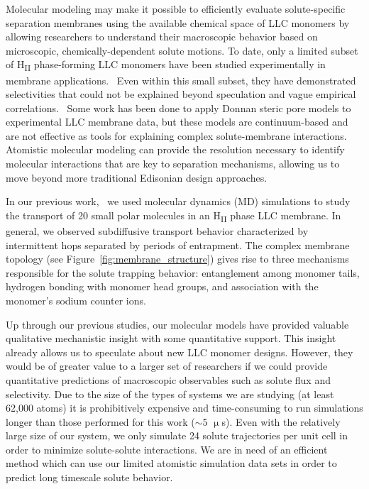 \documentclass[journal=jctcce,manuscript=article]{achemso}
\begin{document}
  Molecular modeling may make it possible to efficiently evaluate solute-specific
  separation membranes using the available chemical space of LLC monomers by 
  allowing researchers to understand their macroscopic behavior based on 
  microscopic, chemically-dependent solute motions. To date, only a limited 
  subset of H\textsubscript{II} phase-forming LLC monomers have been studied
  experimentally in membrane applications.~\cite{carter_glycerol-based_2012,hatakeyama_nanoporous_2010,smith_ordered_1997,zhou_assembly_2003,resel_structural_2000}
  Even within this small subset, they have demonstrated selectivities that
  could not be explained beyond speculation and vague empirical
  correlations.~\cite{dischinger_application_2017} 
  Some work has been done to apply
  Donnan steric pore models to experimental LLC membrane data, but these models 
  are continuum-based and are not effective as tools for explaining complex
  solute-membrane interactions.~\cite{hatakeyama_water_2011} 
  Atomistic molecular modeling can provide the 
  resolution necessary to identify molecular interactions that are key to separation
  mechanisms, allowing us to move beyond more traditional Edisonian design approaches.

  In our previous work,~\cite{coscia_chemically_2019} we used molecular
  dynamics (MD) simulations to study the transport of 20 small polar molecules
  in an H\textsubscript{II} phase LLC membrane. 
  In general,
  we observed subdiffusive transport behavior characterized by intermittent
  hops separated by periods of entrapment. 
  The complex membrane topology (see Figure~\ref{fig:membrane_structure}) gives rise
  to
  three mechanisms
  responsible for the solute trapping behavior: entanglement among monomer
  tails, hydrogen bonding with monomer head groups, and association with the
  monomer's sodium counter ions.
  
  Up through our previous studies, our molecular models have provided valuable
  qualitative mechanistic insight with some quantitative support. This insight
  already allows us to speculate about new LLC monomer designs. However, they
  would be of greater value to a larger set of researchers if we could provide
  quantitative predictions of macroscopic observables such as solute flux and
  selectivity. Due to the size of the types of systems we are studying (at
  least 62,000 atoms) it is prohibitively expensive and time-consuming to run
  simulations longer than those performed for this work ($\sim$5 $\upmu$s). Even
  with the relatively large size of our system, we only simulate 24 solute
  trajectories per unit cell in order to minimize solute-solute interactions.
  We are in need of an efficient method which can use our limited atomistic 
  simulation data sets in order to predict long timescale solute behavior.  
\end{document}
